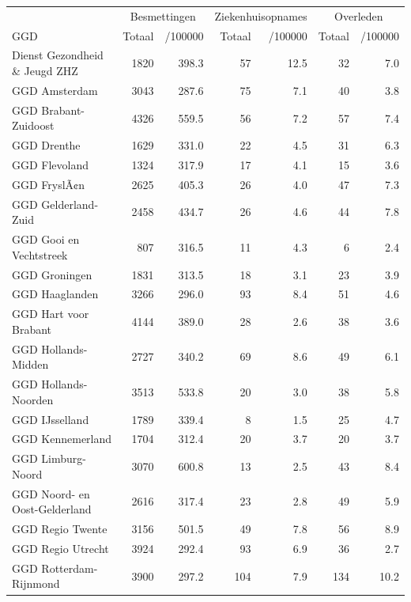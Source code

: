 \documentclass[
  english,
  man,floatsintext]{apa6}
\begin{document}
\begin{table}[H]
\centering\begingroup\fontsize{10}{12}\selectfont

\begin{threeparttable}
\begin{tabular}{lrrrrrr}
\toprule
\multicolumn{1}{c}{ } & \multicolumn{2}{c}{Besmettingen} & \multicolumn{2}{c}{Ziekenhuisopnames} & \multicolumn{2}{c}{Overleden} \\
\cmidrule(l{3pt}r{3pt}){2-3} \cmidrule(l{3pt}r{3pt}){4-5} \cmidrule(l{3pt}r{3pt}){6-7}
GGD & Totaal & /100000 & Totaal & /100000 & Totaal & /100000\\
\midrule
Dienst Gezondheid \& Jeugd ZHZ & 1820 & 398.3 & 57 & 12.5 & 32 & 7.0\\
GGD Amsterdam & 3043 & 287.6 & 75 & 7.1 & 40 & 3.8\\
GGD Brabant-Zuidoost & 4326 & 559.5 & 56 & 7.2 & 57 & 7.4\\
GGD Drenthe & 1629 & 331.0 & 22 & 4.5 & 31 & 6.3\\
GGD Flevoland & 1324 & 317.9 & 17 & 4.1 & 15 & 3.6\\
GGD FryslÃ¢n & 2625 & 405.3 & 26 & 4.0 & 47 & 7.3\\
GGD Gelderland-Zuid & 2458 & 434.7 & 26 & 4.6 & 44 & 7.8\\
GGD Gooi en Vechtstreek & 807 & 316.5 & 11 & 4.3 & 6 & 2.4\\
GGD Groningen & 1831 & 313.5 & 18 & 3.1 & 23 & 3.9\\
GGD Haaglanden & 3266 & 296.0 & 93 & 8.4 & 51 & 4.6\\
GGD Hart voor Brabant & 4144 & 389.0 & 28 & 2.6 & 38 & 3.6\\
GGD Hollands-Midden & 2727 & 340.2 & 69 & 8.6 & 49 & 6.1\\
GGD Hollands-Noorden & 3513 & 533.8 & 20 & 3.0 & 38 & 5.8\\
GGD IJsselland & 1789 & 339.4 & 8 & 1.5 & 25 & 4.7\\
GGD Kennemerland & 1704 & 312.4 & 20 & 3.7 & 20 & 3.7\\
GGD Limburg-Noord & 3070 & 600.8 & 13 & 2.5 & 43 & 8.4\\
GGD Noord- en Oost-Gelderland & 2616 & 317.4 & 23 & 2.8 & 49 & 5.9\\
GGD Regio Twente & 3156 & 501.5 & 49 & 7.8 & 56 & 8.9\\
GGD Regio Utrecht & 3924 & 292.4 & 93 & 6.9 & 36 & 2.7\\
GGD Rotterdam-Rijnmond & 3900 & 297.2 & 104 & 7.9 & 134 & 10.2\\

\end{tabular}
\end{threeparttable}
\end{table}
\end{document}
